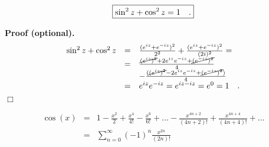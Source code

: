 \documentclass[12pt]{book}
\newcommand{\importantFormula}[1]{\begin{equation} \boxed{#1} \end{equation}}
\newenvironment{proofOptional}[1][]{ \textbf{Proof (optional).}}{$\Box$\medskip}
\begin{document}
\importantFormula{\label{eqsinSquaredPlusCosSquared}
\sin^2 z +\cos^2 z= 1\quad .
}


\begin{proofOptional}
\begin{equation*}
\begin{array}{rcl}
\sin^2 z +\cos^2 z&=& \frac{(e^{iz}+e^{-iz})^2}{2^2}+\frac{(e^{iz}+e^{-iz})^2}{(2i)^2}=\\
&=&\frac{ \cancel{(e^{iz})^2} + 2 e^{iz}e^{-iz} + \cancel{(e^{-iz})^2}}{4} \\
&&-\frac{(\cancel{(e^{iz})^2}-2e^{iz}e^{-iz} + \cancel{(e^{-iz})^2})}{4} \\&=& e^{iz}e^{-iz}= e^{iz-iz}=e^0=1\quad .
\end{array}
\end{equation*}
\end{proofOptional}

\begin{equation}\label{eqcosPowerSeries} 
\begin{array}{rcl}
\cos(x)&=&1-\frac{x^2}{2}+\frac{x^4}{4!}-\frac{x^6}{6!}+\dots -\frac{x^{4n+2}}{(4n+2)!}+ \frac{x^{4n+4}}{(4n+4)!}+\dots\\
&=&\displaystyle \sum_{n=0}^\infty (-1)^n\frac{x^{2n}}{(2n)!}
\end{array}
\end{equation}
\end{document}
